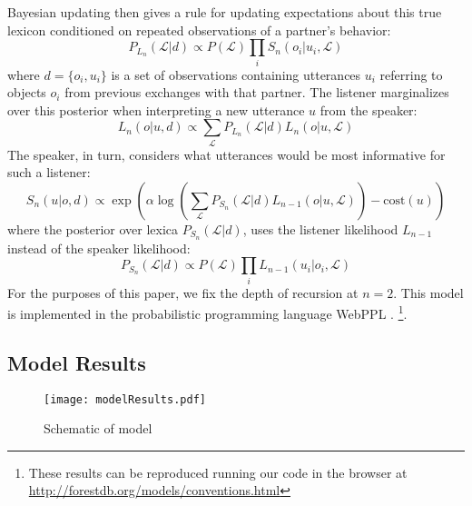 Bayesian updating then gives a rule for updating expectations about this true lexicon conditioned on repeated observations of a partner's behavior:
$$P_{L_n}(\mathcal{L} | d) \propto P(\mathcal{L})\prod_i S_n(o_i | u_i, \mathcal{L})$$
where $d = \{o_i, u_i\}$ is a set of observations containing utterances $u_i$ referring to objects $o_i$ from previous exchanges with that partner.
The listener marginalizes over this posterior when interpreting a new utterance $u$ from the speaker:
$$L_n(o | u, d) \propto \sum_\mathcal{L}P_{L_n}(\mathcal{L}|d)L_n(o | u,\mathcal{L})$$
The speaker, in turn, considers what utterances would be most informative for such a listener:
$$S_n(u | o, d) \propto \exp( \alpha\log\left(\sum_{\mathcal{L}} P_{S_n}(\mathcal{L} | d) L_{n-1}(o | u, \mathcal{L})\right) - \textrm{cost}(u) )$$
where the posterior over lexica $P_{S_n}(\mathcal{L} | d)$, uses the listener likelihood $L_{n-1}$ instead of the speaker likelihood:
$$P_{S_n}(\mathcal{L} | d) \propto P(\mathcal{L})\prod_i L_{n-1}(u_i | o_i, \mathcal{L})$$
For the purposes of this paper, we fix the depth of recursion at $n = 2$.
This model is implemented in the probabilistic programming language WebPPL \cite{GoodmanStuhlmuller14_DIPPL}. \footnote{These results can be reproduced running our code in the browser at \url{http://forestdb.org/models/conventions.html}}. 

\subsection{Model Results}

\begin{figure}
\centering
    \texttt{[image: modelResults.pdf]}
  \caption{Schematic of model}
  \label{fig:modelResults}
\end{figure}

